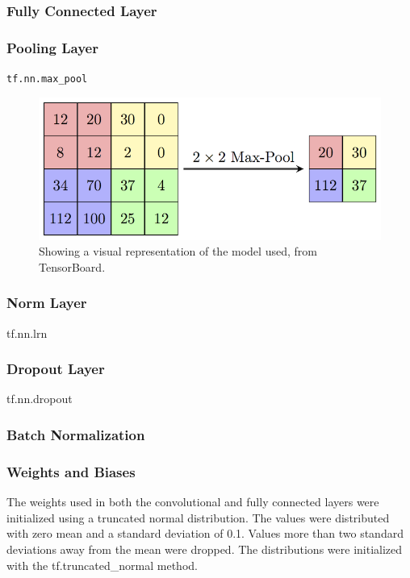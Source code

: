 \documentclass[]{article}
\begin{document}
\subsubsection{Fully Connected Layer}



\subsubsection{Pooling Layer}

\texttt{tf.nn.max\_pool}

\begin{figure}[h]
	\includegraphics[width=\textwidth]{pool}
	\caption{Showing a visual representation of the model used, from TensorBoard.}
	\label{pool}
	\centering
\end{figure}

\subsubsection{Norm Layer}

tf.nn.lrn

\subsubsection{Dropout Layer}

tf.nn.dropout

\subsubsection{Batch Normalization}

\subsubsection{Weights and Biases} \label{weights}

The weights used in both the convolutional and fully connected layers were initialized using a truncated normal distribution. The values were distributed with zero mean and a standard deviation of 0.1. Values more than two standard deviations away from the mean were dropped. The distributions were initialized with the tf.truncated\_normal method. 
\end{document}
